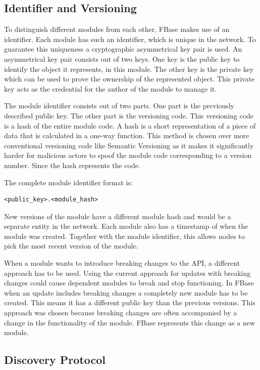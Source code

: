 \subsection{Identifier and Versioning}
To distinguish different modules from each other, FBase makes use of an identifier. Each module has such an identifier, which is unique in the network. To guarantee this uniqueness a cryptographic asymmetrical key pair is used. An asymmetrical key pair consists out of two keys. One key is the public key to identify the object it represents, in this module. The other key is the private key which can be used to prove the ownership of the represented object. This private key acts as the credential for the author of the module to manage it.

The module identifier consists out of two parts. One part is the previously described public key. The other part is the versioning code. This versioning code is a hash of the entire module code. A hash is a short representation of a piece of data that is calculated in a one-way function. This method is chosen over more conventional versioning code like Semantic Versioning as it makes it significantly harder for malicious actors to spoof the module code corresponding to a version number. Since the hash represents the code.

The complete module identifier format is:
\begin{verbatim}
<public_key>.<module_hash>
\end{verbatim}

New versions of the module have a different module hash and would be a separate entity in the network. Each module also has a timestamp of when the module was created. Together with the module identifier, this allows nodes to pick the most recent version of the module.

When a module wants to introduce breaking changes to the API, a different approach has to be used. Using the current approach for updates with breaking changes could cause dependent modules to break and stop functioning. In FBase when an update includes breaking changes a completely new module has to be created. This means it has a different public key than the previous versions. This approach was chosen because breaking changes are often accompanied by a change in the functionality of the module. FBase represents this change as a new module.

\subsection{Discovery Protocol}

